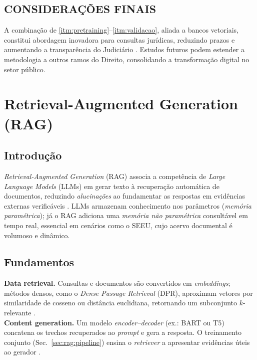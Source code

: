 \subsection*{CONSIDERAÇÕES FINAIS}
A combinação de \ref{itm:pretraining}–\ref{itm:validacao}, aliada a bancos
vetoriais, constitui abordagem inovadora para consultas jurídicas, reduzindo
prazos e aumentando a transparência do Judiciário
\cite{belarmino2025aplicacao,divald2021eformalization}. Estudos futuros podem
estender a metodologia a outros ramos do Direito, consolidando a transformação
digital no setor público.

\section{Retrieval-Augmented Generation (RAG)}
\label{sec:rag}

\subsection{Introdução}
\textit{Retrieval-Augmented Generation} (RAG) associa a competência de
\textit{Large Language Models} (LLMs) em gerar texto à recuperação automática de
documentos, reduzindo \textit{alucinações} ao fundamentar as respostas em
evidências externas verificáveis
\cite{lewis2020rag,gao2023survey,edwards2024hybrid,pujiono2024implementing}.
LLMs armazenam conhecimento nos parâmetros (\emph{memória paramétrica}); já o
RAG adiciona uma \emph{memória não paramétrica} consultável em tempo real,
essencial em cenários como o SEEU, cujo acervo documental é volumoso e
dinâmico.

\subsection{Fundamentos}
\textbf{Data retrieval.} Consultas e documentos são convertidos em
\emph{embeddings}; métodos densos, como o \textit{Dense Passage Retrieval}
(DPR), aproximam vetores por similaridade de cosseno ou distância euclidiana,
retornando um subconjunto $k$-relevante
\cite{lewis2020rag,taipalus2024vector,mageirakos2025cracking}.\\
\textbf{Content generation.} Um modelo \emph{encoder--decoder} (ex.: BART ou
T5) concatena os trechos recuperados ao \textit{prompt} e gera a resposta. O
treinamento conjunto (Sec.~\ref{sec:rag:pipeline}) ensina o \textit{retriever}
a apresentar evidências úteis ao gerador
\cite{aquino2024extracting,belarmino2025aplicacao}.

